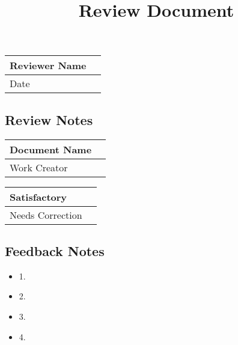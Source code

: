 \documentclass{article}
\title{Review Document}
\date{}
\begin{document}
\maketitle
\begin{center}
    \begin{tabular}{ | p{3cm} | p{10cm} |}
    \hline
    Reviewer Name                & \\ \hline
    Date                         & \\ \hline
    \end{tabular}
\end{center}

\subsection{Review Notes}
\begin{center}
    \begin{tabular}{ | p{7cm} | p{7cm} |}
    \hline
    Document Name                    & \\ \hline
    Work Creator                     & \\ \hline
    \end{tabular}
\end{center}



\begin{center}
    \begin{tabular}{ | p{7cm} | p{7cm} |}
    \hline
    Satisfactory                         & \\ \hline
    Needs Correction                     & \\ \hline
    \end{tabular}
\end{center}

\subsection{Feedback Notes}

\begin{itemize}
    \item 1.
    \item 2.
    \item 3.
    \item 4.
\end{itemize}
\end{document}
